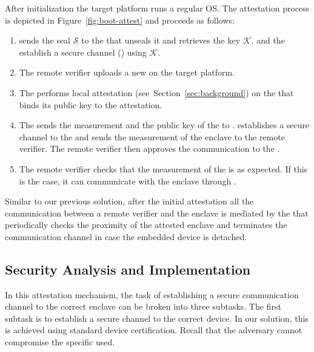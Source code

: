  After initialization the target platform runs a regular OS. The attestation process is depicted in Figure~\ref{fig:boot-attest} and proceeds as follows:

\begin{enumerate}


  \item[\one] \device sends the seal $\mathcal{S}$ to the \nameclave that unseals it and retrieves the key $\mathcal{K}$. \device and the \nameclave establish a secure channel (\tls) using $\mathcal{K}$.

  \item[\two] The remote verifier uploads a new \app on the target platform.

  \item[\three] The \nameclave performs local attestation (see~Section~\ref{sec:background}) on the \app that binds its public key to the attestation. %

  \item[\four] The \nameclave sends the measurement and the public key of the \app to \device. \device establishes a secure channel to the \app and sends the measurement of the enclave to the remote verifier. The remote verifier then approves the communication to the \app.

  \item[\five] The remote verifier checks that the measurement of the \app is as expected. If this is the case, it can communicate with the enclave through \device.


\end{enumerate}


Similar to our previous solution, after the initial attestation all the communication between a remote verifier and the enclave is mediated by the \device that periodically checks the proximity of the attested enclave and terminates the communication channel in case the embedded device is detached.


\subsection{Security Analysis and Implementation}
 
In this attestation mechanism, the task of establishing a secure communication channel to the correct enclave can be broken into three subtasks. The first subtask is to establish a secure channel to the correct \device device. In our solution, this is achieved using standard device certification. Recall that the adversary cannot compromise the specific \device used. 


